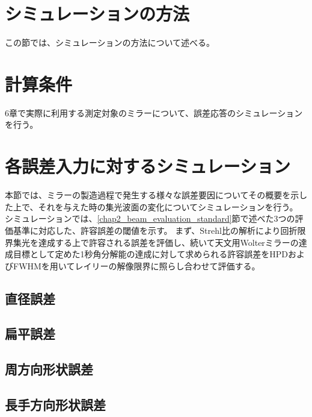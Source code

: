 \section{シミュレーションの方法}
この節では、シミュレーションの方法について述べる。


\clearpage
\newpage

\section{計算条件}
6章で実際に利用する測定対象のミラーについて、誤差応答のシミュレーションを行う。

\clearpage
\newpage


\section{各誤差入力に対するシミュレーション}
\label{chap2_simulation_error_response}

本節では、ミラーの製造過程で発生する様々な誤差要因についてその概要を示した上で、それを与えた時の集光波面の変化についてシミュレーションを行う。
シミュレーションでは、\ref{chap2_beam_evaluation_standard}節で述べた3つの評価基準に対応した、許容誤差の閾値を示す。
まず、Strehl比の解析により回折限界集光を達成する上で許容される誤差を評価し、続いて天文用Wolterミラーの達成目標として定めた1秒角分解能の達成に対して求められる許容誤差をHPDおよびFWHMを用いてレイリーの解像限界に照らし合わせて評価する。

\subsection{直径誤差}

\subsection{扁平誤差}

\subsection{周方向形状誤差}

\subsection{長手方向形状誤差}

